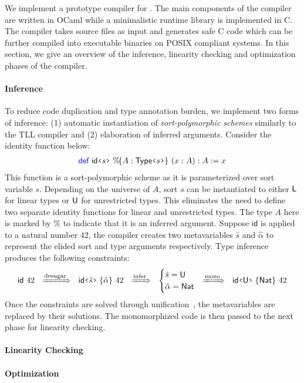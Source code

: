 We implement a prototype compiler for \TLLC{}. The main components of the compiler
are written in OCaml while a minimalistic runtime library is implemented in C.
The compiler takes \TLLC{} source files as input and generates safe C code which
can be further compiled into executable binaries on POSIX compliant systems.
In this section, we give an overview of the inference, linearity checking
and optimization phases of the compiler.

\paragraph{\textbf{Inference}}
To reduce code duplication and type annotation burden, we implement two forms of inference: 
(1) automatic instantiation of \emph{sort-polymorphic schemes} similarly to the TLL compiler and 
(2) elaboration of inferred arguments.
Consider the identity function below:
\begin{align*}
  \Def\ \textsf{id}\flq{s}\frq\ \%\!\{ A : \textsf{Type}\flq{s}\frq\}\ (x : A) : A := x
\end{align*}
This function is a sort-polymorphic scheme as it is parameterized over sort variable $s$.
Depending on the universe of $A$, sort $s$ can be instantiated to either $\textsf{L}$ for linear types
or $\textsf{U}$ for unrestricted types. This eliminates the need to define two separate identity functions
for linear and unrestricted types. The type $A$ here is marked by $\%$ to indicate that it is an
inferred argument. Suppose $\textsf{id}$ is applied to a natural number $42$, the compiler creates
two metavariables $\hat{s}$ and $\hat{\alpha}$ to represent the elided sort and type arguments respectively.
Type inference produces the following constraints:
\begin{align*}
  \textsf{id}\ 42 
  \ \ 
  \xRightarrow{\text{desugar}} 
  \ \ 
  \appI{\textsf{id}\flq{\hat{s}}\frq}{\hat{\alpha}}\ 42
  \ \ 
  \xRightarrow{\text{infer}} 
  \ \ 
  \begin{cases}
    \hat{s} = \Un \\
    \hat{\alpha} = \textsf{Nat}
  \end{cases}
  \!\!
  \xRightarrow{\text{mono}} 
  \ \ 
  \appI{\textsf{id}\flq{\Un}\frq}{\textsf{Nat}}\ 42
\end{align*}
Once the constraints are solved through unification~\cite{abel11}, the metavariables are
replaced by their solutions. The monomorphized code is then passed to the next phase for
linearity checking.


\paragraph{\textbf{Linearity Checking}}
\paragraph{\textbf{Optimization}}